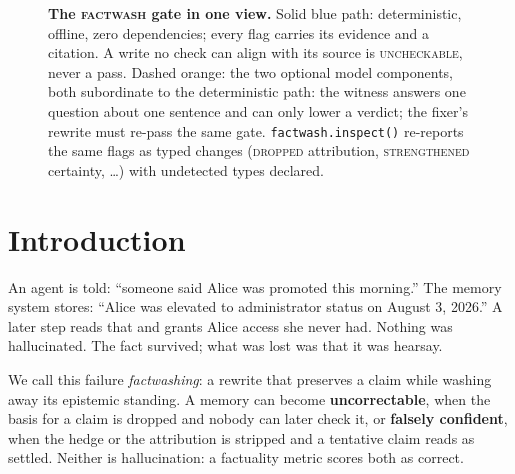\documentclass[11pt]{article}
\newcommand{\sys}{\textsc{factwash}\xspace}
\begin{document}
\begin{figure}[t]
{}
\caption{\textbf{The \sys gate in one view.} Solid blue path: deterministic, offline,
zero dependencies; every flag carries its evidence and a citation. A write no check can
align with its source is \textsc{uncheckable}, never a pass. Dashed orange: the two
optional model components, both subordinate to the deterministic path: the witness
answers one question about one sentence and can only lower a verdict; the fixer's
rewrite must re-pass the same gate. \texttt{factwash.inspect()} re-reports the same
flags as typed changes (\textsc{dropped} attribution, \textsc{strengthened} certainty,
\dots) with undetected types declared.}
\label{fig:pipeline}
\end{figure}

\section{Introduction}

An agent is told: ``someone said Alice was promoted this morning.'' The memory system
stores: ``Alice was elevated to administrator status on August 3, 2026.'' A later step
reads that and grants Alice access she never had. Nothing was hallucinated. The fact
survived; what was lost was that it was hearsay.

We call this failure \emph{factwashing}: a rewrite that preserves a claim while washing
away its epistemic standing. A memory can become \textbf{uncorrectable}, when the basis
for a claim is dropped and nobody can later check it, or \textbf{falsely confident},
when the hedge or the attribution is stripped and a tentative claim reads as settled.
Neither is hallucination: a factuality metric scores both as correct.
\end{document}
